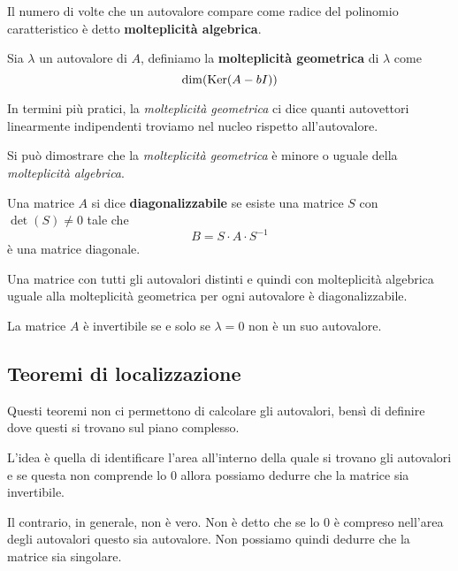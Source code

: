 \begin{definition}
	Il numero di volte che un autovalore compare come radice del polinomio caratteristico è detto
	\textbf{molteplicità algebrica}.
\end{definition}

\begin{definition}
	Sia $\lambda$ un autovalore di $A$, definiamo la \textbf{molteplicità geometrica} di $\lambda$ come
	\[ \dim (\operatorname{Ker} (A - b I)) \]
\end{definition}

In termini più pratici, la \emph{molteplicità geometrica} ci dice quanti autovettori linearmente indipendenti
troviamo nel nucleo rispetto all'autovalore.

Si può dimostrare che la \emph{molteplicità geometrica} è minore o uguale della \emph{molteplicità algebrica}.

\begin{definition}
	Una matrice $A$ si dice \textbf{diagonalizzabile} se esiste una matrice $S$ con $\det (S) \neq 0$ tale che
	\[ B = S \cdot A \cdot S^{-1} \]
	è una matrice diagonale.
\end{definition}

\begin{theorem}
	Una matrice con tutti gli autovalori distinti e quindi con molteplicità algebrica uguale alla molteplicità
	geometrica per ogni autovalore è diagonalizzabile.
\end{theorem}

\begin{theorem}
	La matrice $A$ è invertibile se e solo se $\lambda = 0$ non è un suo autovalore.
\end{theorem}

\subsection{Teoremi di localizzazione}
Questi teoremi non ci permettono di calcolare gli autovalori, bensì di definire dove questi si trovano sul piano
complesso.

L'idea è quella di identificare l'area all'interno della quale si trovano gli autovalori e se questa non comprende
lo 0 allora possiamo dedurre che la matrice sia invertibile.

Il contrario, in generale, non è vero. Non è detto che se lo 0 è compreso nell'area degli autovalori questo sia
autovalore. Non possiamo quindi dedurre che la matrice sia singolare.

